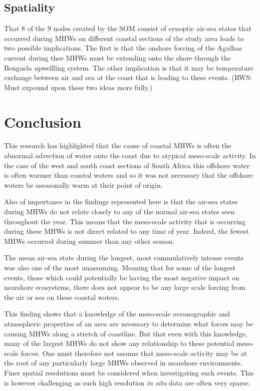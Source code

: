\documentclass[a4paper,10pt,review]{elsarticle}
\begin{document}
\subsection{Spatiality}
That 8 of the 9 nodes created by the SOM consist of synoptic air-sea states that occurred during MHWs on different coastal sections of the study area leads to two possible implications. The first is that the onshore forcing of the Agulhas current during thee MHWs must be extending onto the shore through the Benguela upwellling system. The other implication is that it may be temperature exchange between air and sea at the coast that is leading to these events. (RWS: Must expound upon these two ideas more fully.)

\section{Conclusion}
This research has highlighted that the cause of coastal MHWs is often the abnormal advection of water onto the coast due to atypical meso-scale activity. In the case of the west and south coast sections of South Africa this offshore water is often warmer than coastal waters and so it was not necessary that the offshore waters be aseasonally warm at their point of origin.

Also of importance in the findings represented here is that the air-sea states during MHWs do not relate closely to any of the normal air-sea states seen throughout the year. This means that the meso-scale activity that is occurring during these MHWs is not direct related to any time of year. Indeed, the fewest MHWs occurred during summer than any other season.

The mean air-sea state during the longest, most cummulatively intense events was also one of the most unassuming. Meaning that for some of the longest events, those which could potentially be having the most negative impact on nearshore ecosystems, there does not appear to be any large scale forcing from the air or sea on these coastal waters.

This finding shows that a knowledge of the meso-scale oceanographic and atmospheric properties of an area are necessary to determine what forces may be causing MHWs along a stretch of coastline. But that even with this knowledge, many of the largest MHWs do not show any relationship to these potential meso-scale forces. One must therefore not assume that meso-scale activity may be at the root of any particularly large MHWs observed in nearshore environments. Finer spatial resolutions must be considered when investigating such events. This is however challenging as such high resolution \emph{in situ} data are often very sparse.
\end{document}
